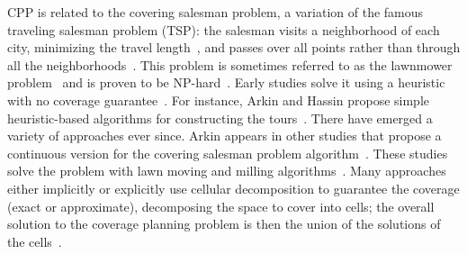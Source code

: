 CPP is related to the covering salesman problem, a variation of the famous traveling salesman problem (TSP): the salesman visits a neighborhood of each city, minimizing the travel length~\citep{arkin1994approximation}, and passes over all points rather than through all the neighborhoods~\citep{choset2001coverage}. This problem is sometimes referred to as the lawnmower problem~\citep{galceran2013survey} and is proven to be NP-hard~\citep{arkin2000approximation}. Early studies solve it using a heuristic with no coverage guarantee~\citep{choset2001coverage}. For instance, Arkin and Hassin propose simple heuristic-based algorithms for constructing the tours~\citep{arkin1994approximation}. There have emerged a variety of approaches ever since. Arkin appears in other studies that propose a continuous version for the covering salesman problem algorithm~\citep{arkin1993lawnmower,fekete1994lawnmower,arkin2000approximation}. These studies solve the problem with lawn moving and milling algorithms~\citep{arkin2000approximation}. Many approaches either implicitly or explicitly use cellular decomposition to guarantee the coverage (exact or approximate), decomposing the space to cover into cells; the overall solution to the coverage planning problem is then the union of the solutions of the cells~\citep{choset2001coverage}. 

